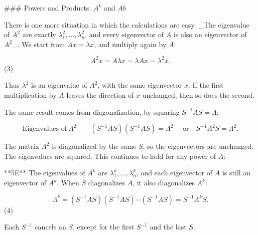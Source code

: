 ### Powers and Products: \(A^{k}\) and \(Ab\)

There is one more situation in which the calculations are easy. _The eigenvalue of \(A^{2}\) are exactly \(\lambda_{1}^{2},\ldots,\lambda_{n}^{2}\), and every eigenvector of \(A\) is also an eigenvector of \(A^{2}\)_. We start from \(Ax=\lambda x\), and multiply again by \(A\):

\[A^{2}x=A\lambda x=\lambda Ax=\lambda^{2}x.\] (3)

Thus \(\lambda^{2}\) is an eigenvalue of \(A^{2}\), with the same eigenvector \(x\). If the first multiplication by \(A\) leaves the direction of \(x\) unchanged, then so does the second.

The same result comes from diagonalization, by squaring \(S^{-1}AS=\Lambda\):

\[\text{Eigenvalues of}\ A^{2}\qquad(S^{-1}AS)(S^{-1}AS)=\Lambda^{2}\quad\text{ or}\quad S^{-1}A^{2}S=\Lambda^{2}.\]

The matrix \(A^{2}\) is diagonalized by the same \(S\), so the eigenvectors are unchanged. The eigenvalues are squared. This continues to hold for any power of \(A\):

**5E** The eigenvalues of \(A^{k}\) are \(\lambda_{1}^{k},\ldots,\lambda_{n}^{k}\), and each eigenvector of \(A\) is still an eigenvector of \(A^{k}\). When \(S\) diagonalizes \(A\), it also diagonalizes \(A^{k}\):

\[\Lambda^{k}=(S^{-1}AS)(S^{-1}AS)\cdots(S^{-1}AS)=S^{-1}A^{k}S.\] (4)

Each \(S^{-1}\) cancels an \(S\), except for the first \(S^{-1}\) and the last \(S\).

 